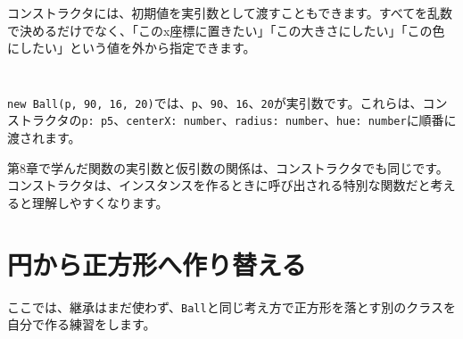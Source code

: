 コンストラクタには、初期値を実引数として渡すこともできます。すべてを乱数で決めるだけでなく、「このx座標に置きたい」「この大きさにしたい」「この色にしたい」という値を外から指定できます。

\begin{listing}[htbp]
\inputminted[firstline=1,lastline=39]{ts}{typescript-p5/listings/chapter11/ball-class-constructor-arguments.ts}
\caption{実引数を受け取るBallクラス（\texttt{chapter11/ball-class-constructor-arguments.ts}）}
\label{lst:chapter11-ball-class-constructor-arguments-class}
\end{listing}

\begin{listing}[htbp]
\inputminted[firstline=41,lastline=64]{ts}{typescript-p5/listings/chapter11/ball-class-constructor-arguments.ts}
\caption{コンストラクタに実引数を渡して円を作る（\texttt{chapter11/ball-class-constructor-arguments.ts}）}
\label{lst:chapter11-ball-class-constructor-arguments-sketch}
\end{listing}

\texttt{new Ball(p, 90, 16, 20)}では、\texttt{p}、\texttt{90}、\texttt{16}、\texttt{20}が実引数です。これらは、コンストラクタの\texttt{p: p5}、\texttt{centerX: number}、\texttt{radius: number}、\texttt{hue: number}に順番に渡されます。

第8章で学んだ関数の実引数と仮引数の関係は、コンストラクタでも同じです。コンストラクタは、インスタンスを作るときに呼び出される特別な関数だと考えると理解しやすくなります。

\section{円から正方形へ作り替える}

ここでは、継承はまだ使わず、\texttt{Ball}と同じ考え方で正方形を落とす別のクラスを自分で作る練習をします。

\begin{listing}[htbp]
\inputminted[firstline=1,lastline=37]{ts}{typescript-p5/listings/chapter11/square-class-array.ts}
\caption{FallingSquareクラスの定義（\texttt{chapter11/square-class-array.ts}）}
\label{lst:chapter11-square-class-array-class}
\end{listing}

\begin{listing}[htbp]
\inputminted[firstline=39,lastline=64]{ts}{typescript-p5/listings/chapter11/square-class-array.ts}
\caption{FallingSquareクラスで複数の正方形を動かす（\texttt{chapter11/square-class-array.ts}）}
\label{lst:chapter11-square-class-array-sketch}
\end{listing}

